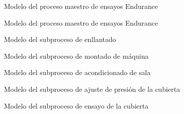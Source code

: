 \begin{figure}[H]
	\begin{center}
		
	\end{center}
	\caption{Modelo del proceso maestro de ensayos Endurance}
\end{figure}

\begin{figure}[H]
	\begin{center}
		
	\end{center}
	\caption{Modelo del proceso maestro de ensayos Endurance}
\end{figure}

\begin{figure}[H]
	\begin{center}
		
	\end{center}
	\caption{Modelo del subproceso de enllantado}
\end{figure}

\begin{figure}[H]
	\begin{center}
		
	\end{center}
	\caption{Modelo del subproceso de montado de máquina}
\end{figure}

\begin{figure}[H]
	\begin{center}
		
	\end{center}
	\caption{Modelo del subproceso de acondicionado de sala}
\end{figure}

\begin{figure}[H]
	\begin{center}
		
	\end{center}
	\caption{Modelo del subproceso de ajuste de presión de la cubierta}
\end{figure}

\begin{figure}[H]
	\begin{center}
		
	\end{center}
	\caption{Modelo del subproceso de ensayo de la cubierta}
\end{figure}
